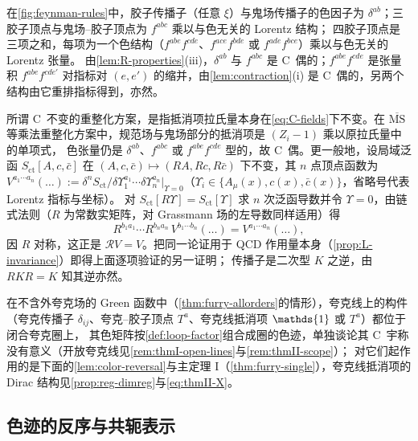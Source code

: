 \documentclass[UTF8,a4paper,11pt,fontset=fandol]{ctexart}
\makeatletter
\let\amsmathbb\mathbb
\renewcommand{\mathbb}[1]{\ifx1#1\mathds{1}\else\amsmathbb{#1}\fi}
\theoremstyle{cplain}
\theoremstyle{cdefinition}
\theoremstyle{cremark}
\renewcommand{\proofname}{证明}
\renewenvironment{proof}[1][\proofname]{\par\pushQED{\qed}\normalfont\topsep6\p@\@plus6\p@\relax
  \trivlist\item[\hskip\labelsep\itshape #1\hspace{0.5em}]\ignorespaces}{\popQED\endtrivlist\@endpefalse}
\numberwithin{equation}{section}
\newcommand{\Rop}{\mathcal{R}}                       %
\makeatother
\begin{document}
\begin{proof}
在\cref{fig:feynman-rules}中，胶子传播子（任意 $\xi$）与鬼场传播子的色因子为 $\delta^{ab}$；三胶子顶点与鬼场--胶子顶点为 $f^{abc}$ 乘以与色无关的 Lorentz 结构；
四胶子顶点是三项之和，每项为一个色结构（$f^{abe}f^{cde}$、$f^{ace}f^{bde}$ 或 $f^{ade}f^{bce}$）乘以与色无关的 Lorentz 张量。
由\cref{lem:R-properties}(iii)，$\delta^{ab}$ 与 $f^{abc}$ 是 C~偶的；$f^{abe}f^{cde}$ 是张量积 $f^{abe}f^{cde'}$ 对指标对 $(e,e')$ 的缩并，由\cref{lem:contraction}(i) 是 C~偶的，另两个结构由它重排指标得到，亦然。

所谓 C~不变的重整化方案，是指抵消项拉氏量本身在\cref{eq:C-fields}下不变。在 $\overline{\mathrm{MS}}$ 等乘法重整化方案中，规范场与鬼场部分的抵消项是 $(Z_i-1)$ 乘以原拉氏量中的单项式，
色张量仍是 $\delta^{ab}$、$f^{abc}$ 或 $f^{abe}f^{cde}$ 型的，故 C~偶。更一般地，设局域泛函 $S_{\mathrm{ct}}[A,c,\bar c]$ 在 $(A,c,\bar c)\mapsto(RA,Rc,R\bar c)$ 下不变，其 $n$ 点顶点函数为
$V^{a_1\cdots a_n}(\dots):=\delta^nS_{\mathrm{ct}}/\delta\Upsilon_1^{a_1}\cdots\delta\Upsilon_n^{a_n}\big|_{\Upsilon=0}$（$\Upsilon_i\in\{A_\mu(x),c(x),\bar c(x)\}$，省略号代表 Lorentz 指标与坐标）。
对 $S_{\mathrm{ct}}[R\Upsilon]=S_{\mathrm{ct}}[\Upsilon]$ 求 $n$ 次泛函导数并令 $\Upsilon=0$，由链式法则（$R$ 为常数实矩阵，对 Grassmann 场的左导数同样适用）得
\begin{equation}\label{eq:color-vertex-invariance}
R^{b_1a_1}\cdots R^{b_na_n}\,V^{b_1\cdots b_n}(\dots)=V^{a_1\cdots a_n}(\dots),
\end{equation}
因 $R$ 对称，这正是 $\Rop V=V$。把同一论证用于 QCD 作用量本身（\cref{prop:L-invariance}）即得上面逐项验证的另一证明；
传播子是二次型 $K$ 之逆，由 $RKR=K$ 知其逆亦然。
\end{proof}

在不含外夸克场的 Green 函数中（\cref{thm:furry-allorders}的情形），夸克线上的构件（夸克传播子 $\delta_{ij}$、夸克--胶子顶点 $T^a$、夸克线抵消项 $\mathbb 1$ 或 $T^a$）都位于闭合夸克圈上，
其色矩阵按\cref{def:loop-factor}组合成圈的色迹，单独谈论其 C~宇称没有意义（开放夸克线见\cref{rem:thmI-open-lines}与\cref{rem:thmII-scope}）；
对它们起作用的是下面的\cref{lem:color-reversal}与主定理 I（\cref{thm:furry-single}），夸克线抵消项的 Dirac 结构见\cref{prop:reg-dimreg}与\cref{eq:thmII-X}。

\subsection{色迹的反序与共轭表示}\label{sec:color-reversal}
\end{document}
